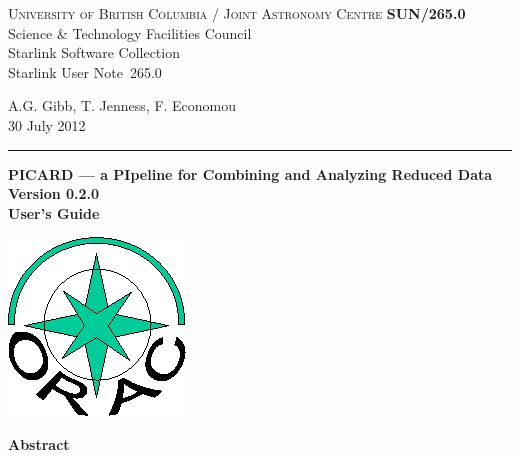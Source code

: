 \documentclass[twoside,11pt]{article}
\newcommand{\stardoccategory}  {Starlink User Note}
\newcommand{\stardocinitials}  {SUN}
\newcommand{\stardocnumber}    {265.0}
\newcommand{\stardocauthors}   {A.G. Gibb, T. Jenness, F. Economou}
\newcommand{\stardocdate}      {30 July 2012}
\newcommand{\stardoctitle}     {PICARD --- a PIpeline for Combining and Analyzing Reduced Data}
\newcommand{\stardocversion}   {Version 0.2.0}
\newcommand{\stardocmanual}    {User's Guide}
\newcommand{\stardocname}{\stardocinitials /\stardocnumber}
\newenvironment{latexonly}{}{}
\renewcommand{\_}{\texttt{\symbol{95}}}
\begin{document}
\thispagestyle{empty}

\begin{latexonly}
   \textsc{University of British Columbia} / \textsc{Joint Astronomy Centre} \hfill \textbf{\stardocname}\\
   {\large Science \& Technology Facilities Council}\\
   {\large Starlink Software Collection\\}
   {\large \stardoccategory\ \stardocnumber}
   \begin{flushright}
   \stardocauthors\\
   \stardocdate
   \end{flushright}
   \vspace{-4mm}
   \rule{\textwidth}{0.5mm}
   \vspace{5mm}
   \begin{center}
   {\Huge\textbf{\stardoctitle \\ [2.5ex]}}
   {\LARGE\textbf{\stardocversion \\ [4ex]}}
   {\Huge\textbf{\stardocmanual}}
   \end{center}
   \vspace{5mm}

\begin{center}
\includegraphics[scale=0.3]{sun265_logo}
\end{center}

   \vspace{10mm}
   \begin{center}
      {\Large\textbf{Abstract}}
   \end{center}
\end{latexonly}
\end{document}
